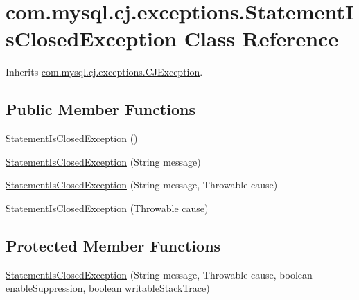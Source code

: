 \hypertarget{classcom_1_1mysql_1_1cj_1_1exceptions_1_1_statement_is_closed_exception}{}\section{com.\+mysql.\+cj.\+exceptions.\+Statement\+Is\+Closed\+Exception Class Reference}
\label{classcom_1_1mysql_1_1cj_1_1exceptions_1_1_statement_is_closed_exception}


Inherits \mbox{\hyperlink{classcom_1_1mysql_1_1cj_1_1exceptions_1_1_c_j_exception}{com.\+mysql.\+cj.\+exceptions.\+C\+J\+Exception}}.

\subsection*{Public Member Functions}
\begin{DoxyCompactItemize}
\item 
\mbox{\hyperlink{classcom_1_1mysql_1_1cj_1_1exceptions_1_1_statement_is_closed_exception_acabe4d30667d1aea8228a6b9372b212d}{Statement\+Is\+Closed\+Exception}} ()
\item 
\mbox{\hyperlink{classcom_1_1mysql_1_1cj_1_1exceptions_1_1_statement_is_closed_exception_aec621d0f4086aae481d94aeb65e15542}{Statement\+Is\+Closed\+Exception}} (String message)
\item 
\mbox{\hyperlink{classcom_1_1mysql_1_1cj_1_1exceptions_1_1_statement_is_closed_exception_af17a0f30ac98573ee7a585b9559f470c}{Statement\+Is\+Closed\+Exception}} (String message, Throwable cause)
\item 
\mbox{\hyperlink{classcom_1_1mysql_1_1cj_1_1exceptions_1_1_statement_is_closed_exception_a771e6b5138118f421dc2cbafbbb614b9}{Statement\+Is\+Closed\+Exception}} (Throwable cause)
\end{DoxyCompactItemize}
\subsection*{Protected Member Functions}
\begin{DoxyCompactItemize}
\item 
\mbox{\hyperlink{classcom_1_1mysql_1_1cj_1_1exceptions_1_1_statement_is_closed_exception_adef6f9b2bccc5d42ad620d9e5e2e2ed0}{Statement\+Is\+Closed\+Exception}} (String message, Throwable cause, boolean enable\+Suppression, boolean writable\+Stack\+Trace)
\end{DoxyCompactItemize}
